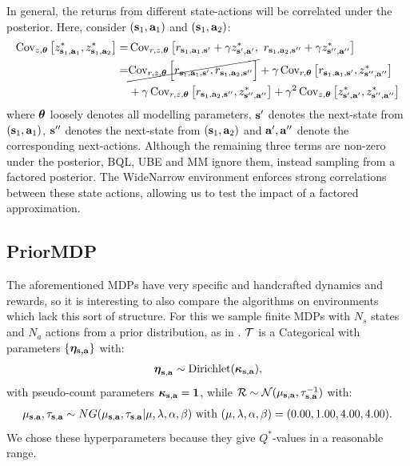 \documentclass{article}
\begin{document}
\begin{appendices}
In general, the returns from different state-actions will be correlated under the posterior. Here, consider $(\mathbf{s}_1, \mathbf{a}_1)$ and $(\mathbf{s}_1, \mathbf{a}_2)$:
\begin{align}
\operatorname{\text{Cov}}_{z, \boldsymbol{\theta}} \left[  z^*_{\mathbf{s}_1, \mathbf{a}_1}, z^*_{\mathbf{s}_1, \mathbf{a}_2} \right] = &\operatorname{\text{Cov}}_{r, z, \boldsymbol{\theta}} \left[  r_{\mathbf{s}_1, \mathbf{a}_1, \mathbf{s}'} + \gamma z^*_{\mathbf{s}', \mathbf{a}'}, ~r_{\mathbf{s}_1, \mathbf{a}_2, \mathbf{s}{''}} + \gamma z^*_{\mathbf{s}{''}, \mathbf{a}{''}} \right] \label{eq:cov_demo} \\
 =& \cancel{\operatorname{\text{Cov}}_{r, z, \boldsymbol{\theta}} \Big[ r_{\mathbf{s}_1, \mathbf{a}_1, \mathbf{s}'}, r_{\mathbf{s}_1, \mathbf{a}_2, \mathbf{s}{''}}\Big]} + \gamma \operatorname{\text{Cov}}_{r, \boldsymbol{\theta}} \left[ r_{\mathbf{s}_1, \mathbf{a}_1, \mathbf{s}'} , z^*_{\mathbf{s}{''}, \mathbf{a}{''}}  \right]\nonumber \\
&+ \gamma \operatorname{\text{Cov}}_{r, z, \boldsymbol{\theta}} \left[  r_{\mathbf{s}_1, \mathbf{a}_2, \mathbf{s}{''}} , z^*_{\mathbf{s}{''}, \mathbf{a}{''}}  \right] + \gamma^2 \operatorname{\text{Cov}}_{z, \boldsymbol{\theta}} \left[ z^*_{\mathbf{s}', \mathbf{a}'},  z^*_{\mathbf{s}{''}, \mathbf{a}{''}} \right]\nonumber
\end{align}
where $\boldsymbol{\theta}$ loosely denotes all modelling parameters, $\mathbf{s}'$ denotes the next-state from $(\mathbf{s}_1, \mathbf{a}_1)$, $\mathbf{s}{''}$ denotes the next-state from $(\mathbf{s}_1, \mathbf{a}_2)$ and $\mathbf{a}{'}, \mathbf{a}{''}$ denote the corresponding next-actions. Although the remaining three terms are non-zero under the posterior, BQL, UBE and MM ignore them, instead sampling from a factored posterior. The WideNarrow environment enforces strong correlations between these state actions, allowing us to test the impact of a factored approximation.

\subsection{PriorMDP}

The aforementioned MDPs have very specific and handcrafted dynamics and rewards, so it is interesting to also compare the algorithms on environments which lack this sort of structure. For this we sample finite MDPs with $N_s$ states and $N_a$ actions from a prior distribution, as in \cite{psrl}. $\mathcal{T}$ is a Categorical with parameters $\{\boldsymbol{\eta_{\mathbf{s}, \mathbf{a}}}\}$ with:
\begin{align*}
\boldsymbol{\eta}_{\mathbf{s}, \mathbf{a}} \sim \text{Dirichlet}(\boldsymbol{\kappa}_{\mathbf{s}, \mathbf{a}}),
\end{align*}
with pseudo-count parameters $\boldsymbol{\kappa}_{\mathbf{s}, \mathbf{a}} = \mathbf{1}$, while $\mathcal{R} \sim \mathcal{N}(\mu_{\mathbf{s}, \mathbf{a}}, \tau_{\mathbf{s}, \mathbf{a}}^{-1})$ with:
\begin{align*}
\mu_{\mathbf{s}, \mathbf{a}}, \tau_{\mathbf{s}, \mathbf{a}} \sim NG(\mu_{\mathbf{s}, \mathbf{a}}, \tau_{\mathbf{s}, \mathbf{a}} | \mu, \lambda, \alpha, \beta) \text{ with } (\mu, \lambda, \alpha, \beta) = (0.00, 1.00, 4.00, 4.00).
\end{align*}
We chose these hyperparameters because they give $Q^*$-values in a reasonable range.


\end{appendices}
\end{document}
